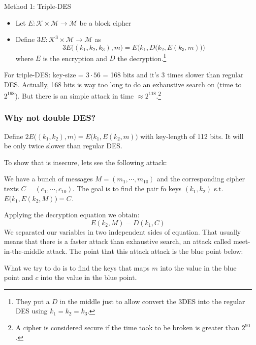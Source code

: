 \documentclass[12pt]{book}
\begin{document}
Method 1: Triple-DES
\begin{itemize}
	\item Let $E:\mathcal{K}\times \mathcal{M}\rightarrow\mathcal{M}$ be a block cipher
	\item Define $3E:\mathcal{K}^{3}\times\mathcal{M}\rightarrow\mathcal{M}$ as $$3E\big((k_{1},k_{2},k_{3}),m\big)=E\Big(k_{1},D\big(k_{2},E(k_{3},m)\big)\Big)$$where $E$ is the encryption and $D$ the decryption.\footnote{They put a $D$ in the middle just to allow convert the 3DES into the regular DES using $k_{1}=k_{2}=k_{3}$.}
\end{itemize}
For triple-DES: key-size = $3\cdot 56$ = 168 bits and it's 3 times slower than regular DES. Actually, 168 bits is way too long to do an exhaustive search on (time to $2^{168}$). But there is an simple attack in time $\approx 2^{118}$.\footnote{A cipher is considered secure if the time took to be broken is greater than $2^{90}$.}

\subsubsection{Why not double DES?}
Define $2E\big((k_{1},k_{2}),m\big)=E\big(k_{1},E(k_{2},m)\big)$ with key-length of 112 bits. It will be only twice slower than regular DES.

To show that is insecure, lets see the following attack:

We have a bunch of messages $M=(m_{1},\cdots,m_{10})$ and the corresponding cipher texts $C=(c_{1},\cdots,c_{10})$. The goal is to find the pair fo keys $(k_{1},k_{2})$ s.t. $E\big(k_{1},E(k_{2},M)\big)=C$.

Applying the decryption equation we obtain:
$$E(k_{2},M)=D(k_{1},C)$$We separated our variables in two independent sides of equation. That usually means that there is a faster attack than exhaustive search, an attack called meet-in-the-middle attack. The point that this attack attack is the blue point below:
\begin{center}
\end{center}What we try to do is to find the keys that maps $m$ into the value in the blue point and $c$ into the value in the blue point.
\end{document}
